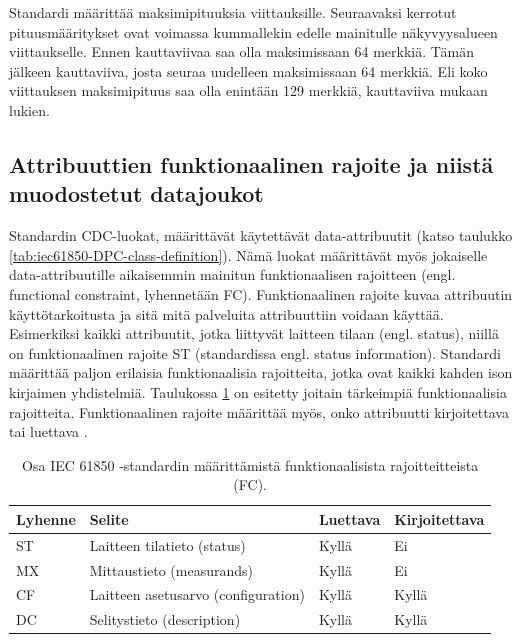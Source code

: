 Standardi määrittää maksimipituuksia viittauksille. Seuraavaksi kerrotut pituusmääritykset ovat voimassa kummallekin edelle mainitulle näkyvyysalueen viittaukselle. Ennen kauttaviivaa saa olla maksimissaan 64 merkkiä. Tämän jälkeen kauttaviiva, josta seuraa uudelleen maksimissaan 64 merkkiä. Eli koko viittauksen maksimipituus saa olla enintään 129 merkkiä, kauttaviiva mukaan lukien. \cite[s.~24,183]{IEC61850-7-2}


\subsection{Attribuuttien funktionaalinen rajoite ja niistä muodostetut datajoukot}
\label{ch:fc-and-dataset}
Standardin CDC-luokat, määrittävät käytettävät data-attribuutit (katso taulukko \ref{tab:iec61850-DPC-class-definition}). Nämä luokat määrittävät myös jokaiselle data-attribuutille aikaisemmin mainitun funktionaalisen rajoitteen (engl. functional constraint, lyhennetään FC). Funktionaalinen rajoite kuvaa attribuutin käyttötarkoitusta ja sitä mitä palveluita attribuuttiin voidaan käyttää. Esimerkiksi kaikki attribuutit, jotka liittyvät laitteen tilaan (engl. status), niillä on funktionaalinen rajoite ST (standardissa engl. status information). Standardi määrittää paljon erilaisia funktionaalisia rajoitteita, jotka ovat kaikki kahden ison kirjaimen yhdistelmiä. Taulukossa \ref{tab:iec61850-functional-constraints} on esitetty joitain tärkeimpiä funktionaalisia rajoitteita. Funktionaalinen rajoite määrittää myös, onko attribuutti kirjoitettava tai luettava \cite[s.~54]{IEC61850-7-2}.

\begin{table}[ht!]
	\caption{Osa IEC 61850 -standardin määrittämistä funktionaalisista rajoitteitteista (FC).}
	\label{tab:iec61850-functional-constraints}
	\begin{tabular}{l | l | l | l}
		\hline
		\textbf{Lyhenne} & \textbf{Selite} & \textbf{Luettava} & \textbf{Kirjoitettava} \\
		\hline \hline
		ST & Laitteen tilatieto (status) & Kyllä & Ei \\
		MX & Mittaustieto (measurands) & Kyllä & Ei \\
		CF & Laitteen asetusarvo (configuration) & Kyllä & Kyllä \\
		DC & Selitystieto (description) & Kyllä & Kyllä \\
		\hline
	\end{tabular}
\end{table}


